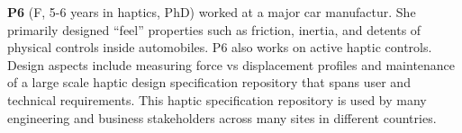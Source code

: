         \textbf{P6} (F, 5-6 years in haptics, PhD) worked at a major car manufactur. %
        She primarily designed ``feel'' properties such as friction, inertia, and detents of physical controls inside automobiles.
        P6 also works on active haptic controls.
        Design aspects include measuring force vs displacement profiles and maintenance of a large scale haptic design specification repository that spans user and technical requirements.
        This haptic specification repository is used by many engineering and business stakeholders across many sites in different countries.
        



